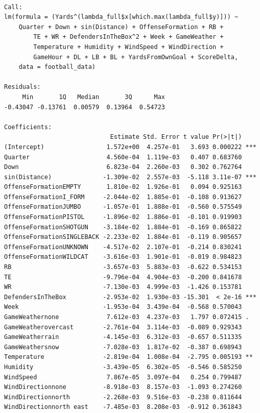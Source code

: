 \documentclass[
  super,
  preprint,
  3p]{elsarticle}
\begin{document}
\begin{verbatim}

Call:
lm(formula = (Yards^(lambda_full$x[which.max(lambda_full$y)])) ~ 
    Quarter + Down + sin(Distance) + OffenseFormation + RB + 
        TE + WR + DefendersInTheBox^2 + Week + GameWeather + 
        Temperature + Humidity + WindSpeed + WindDirection + 
        GameHour + DL + LB + BL + YardsFromOwnGoal + ScoreDelta, 
    data = football_data)

Residuals:
     Min       1Q   Median       3Q      Max 
-0.43047 -0.13761  0.00579  0.13964  0.54723 

Coefficients:
                             Estimate Std. Error t value Pr(>|t|)    
(Intercept)                 1.572e+00  4.257e-01   3.693 0.000222 ***
Quarter                     4.560e-04  1.119e-03   0.407 0.683760    
Down                        6.823e-04  2.260e-03   0.302 0.762764    
sin(Distance)              -1.309e-02  2.557e-03  -5.118 3.11e-07 ***
OffenseFormationEMPTY       1.810e-02  1.926e-01   0.094 0.925163    
OffenseFormationI_FORM     -2.044e-02  1.885e-01  -0.108 0.913627    
OffenseFormationJUMBO      -1.057e-01  1.888e-01  -0.560 0.575549    
OffenseFormationPISTOL     -1.896e-02  1.886e-01  -0.101 0.919903    
OffenseFormationSHOTGUN    -3.184e-02  1.884e-01  -0.169 0.865822    
OffenseFormationSINGLEBACK -2.233e-02  1.884e-01  -0.119 0.905657    
OffenseFormationUNKNOWN    -4.517e-02  2.107e-01  -0.214 0.830241    
OffenseFormationWILDCAT    -3.616e-03  1.901e-01  -0.019 0.984823    
RB                         -3.657e-03  5.883e-03  -0.622 0.534153    
TE                         -9.796e-04  4.904e-03  -0.200 0.841678    
WR                         -7.130e-03  4.999e-03  -1.426 0.153781    
DefendersInTheBox          -2.953e-02  1.930e-03 -15.301  < 2e-16 ***
Week                       -1.953e-04  3.439e-04  -0.568 0.570043    
GameWeathernone             7.612e-03  4.237e-03   1.797 0.072415 .  
GameWeatherovercast        -2.761e-04  3.114e-03  -0.089 0.929343    
GameWeatherrain            -4.145e-03  6.312e-03  -0.657 0.511335    
GameWeathersnow            -7.028e-03  1.817e-02  -0.387 0.698943    
Temperature                -2.819e-04  1.008e-04  -2.795 0.005193 ** 
Humidity                   -3.439e-05  6.302e-05  -0.546 0.585250    
WindSpeed                   7.867e-05  3.097e-04   0.254 0.799487    
WindDirectionnone          -8.918e-03  8.157e-03  -1.093 0.274260    
WindDirectionnorth         -2.268e-03  9.516e-03  -0.238 0.811644    
WindDirectionnorth east    -7.485e-03  8.208e-03  -0.912 0.361843    

\end{verbatim}
\end{document}
